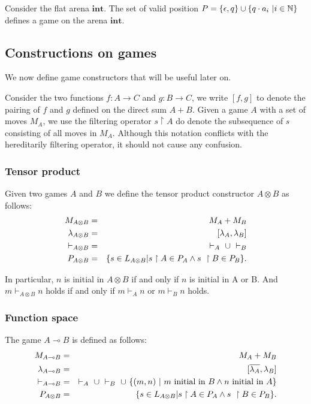 \begin{exmp}  Consider the flat arena  $\mathbf{int}$.
The set of valid position $P = \{ \epsilon, q \} \cup \{ q \cdot
a_i \ | i \in \mathbb{N} \}$ defines a game on the arena $\mathbf{int}$.
\end{exmp}

\subsection{Constructions on games}
\label{sec:gameconstruction}

We now define game constructors that will be useful later on.

Consider the two functions $f : A \rightarrow C$ and $g : B
\rightarrow C$, we write $[f,g]$ to denote the pairing of $f$ and
$g$ defined on the direct sum $A + B$. Given a game $A$ with a set
of moves $M_A$, we use the filtering operator $s \upharpoonright A$
do denote the subsequence of $s$ consisting of all moves in $M_A$.
Although this notation conflicts with the hereditarily filtering
operator, it should not cause any confusion.

\subsubsection{Tensor product}
Given two games $A$ and $B$ we define the tensor product constructor
$A \otimes B$ as follows:
\begin{eqnarray*}
  M_{A \otimes B} &=& M_A + M_B \\
  \lambda_{A\otimes B} &=& [\lambda_A,\lambda_B] \\
  \vdash_{A\otimes B} & = & \vdash_{A}\ \cup\ \vdash_{B} \\
  P_{A\otimes B} & = & \{ s \in L_{A\otimes B} | s \upharpoonright A \in P_A \wedge s \ \upharpoonright B \in P_B  \}.
\end{eqnarray*}

In particular,  $n$ is initial in $A\otimes B$ if and only if $n$ is
initial in A or B. And $m \vdash_{A\otimes B} n$  holds if and only if $m
\vdash_{A} n$ or $m \vdash_{B} n$ holds.

\subsubsection{Function space}
The game $A \multimap B$ is defined as follows:
\begin{eqnarray*}
  M_{A \multimap B} &=& M_A + M_B \\
  \lambda_{A\multimap B} &=& [\overline{\lambda_A},\lambda_B] \\
  \vdash_{A\multimap B} & = & \vdash_{A}\ \union\ \vdash_{B}\ \union\  \{ (m,n) \ |\ m \mbox{ initial in } B \wedge n \mbox{ initial in } A \} \\
  P_{A\otimes B} & = & \{ s \in L_{A\otimes B} | s \upharpoonright A \in P_A \wedge s \ \upharpoonright B \in P_B  \}.
\end{eqnarray*}

